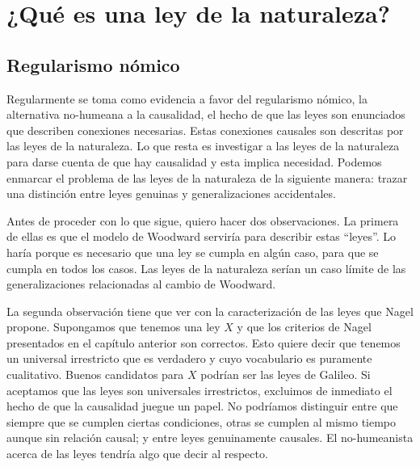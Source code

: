 \chapter{¿Qué es una ley de la naturaleza?}

\section{Regularismo nómico}

\noindent Regularmente se toma como evidencia a favor del regularismo nómico, la alternativa no-humeana a la causalidad, el hecho de que las leyes son enunciados que describen conexiones necesarias. Estas conexiones causales son descritas por las leyes de la naturaleza. Lo que resta es investigar a las leyes de la naturaleza para darse cuenta de que hay causalidad y esta implica necesidad.%
Podemos enmarcar el problema de las leyes de la naturaleza de la siguiente manera: trazar una distinción entre leyes genuinas y generalizaciones accidentales.

Antes de proceder con lo que sigue, quiero hacer dos observaciones. La primera de ellas es que el modelo de Woodward serviría para describir estas ``leyes''. Lo haría porque es necesario que una ley se cumpla en algún caso, para que se cumpla en todos los casos. Las leyes de la naturaleza serían un caso límite de las generalizaciones relacionadas al cambio de Woodward.%

La segunda observación tiene que ver con la caracterización de las leyes que Nagel propone. Supongamos que tenemos una ley $X$ y que los criterios de Nagel presentados en el capítulo anterior son correctos. Esto quiere decir que tenemos un universal irrestricto que es verdadero y cuyo vocabulario es puramente cualitativo. Buenos candidatos para $X$ podrían ser las leyes de Galileo. Si aceptamos que las leyes son universales irrestrictos, excluimos de inmediato el hecho de que la causalidad juegue un papel. No podríamos distinguir entre que siempre que se cumplen ciertas condiciones, otras se cumplen al mismo tiempo aunque sin relación causal; y entre leyes genuinamente causales. El no-humeanista%
acerca de las leyes tendría algo que decir al respecto.

